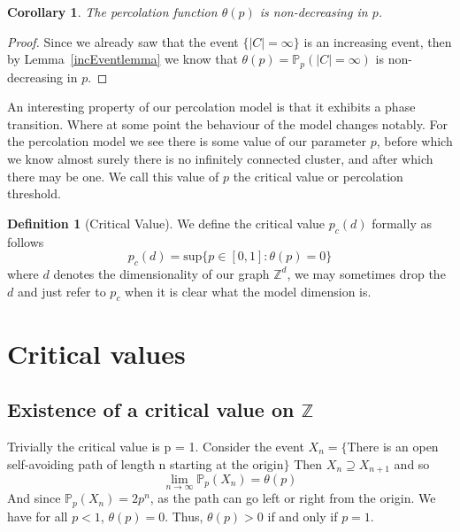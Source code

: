 \documentclass[a4paper,11pt]{article}
\newtheorem{corollary}[theorem]{Corollary}
\theoremstyle{definition}
\newtheorem{definition}[theorem]{Definition}
\newcommand{\ints}{\mathbb{Z}}
\newcommand{\prob}{\mathbb{P}_p}
\begin{document}
\begin{corollary}
	The percolation function $\theta(p)$ is non-decreasing in $p$.
\end{corollary}

\begin{proof}
	Since we already saw that the event $\{|C| = \infty\}$ is an increasing event, then by Lemma~\ref{incEventlemma} we know that $\theta(p) = \prob(|C| = \infty)$ is non-decreasing in $p$.
\end{proof}

An interesting property of our percolation model is that it exhibits a phase transition. Where at some point the behaviour of the model changes notably.
For the percolation model we see there is some value of our parameter $p$, before which we know almost surely there is no infinitely connected cluster, and after which there may be one.
We call this value of $p$ the critical value or percolation threshold.
\begin{definition}[Critical Value]
	We define the critical value $p_c(d)$ formally as follows
	$$p_c(d) = \text{sup}\{p \in [0,1]: \theta(p)=0\} $$
	where $d$ denotes the dimensionality of our graph $\ints^d$, we may sometimes drop the $d$ and just refer to $p_c$ when it is clear what the model dimension is.
\end{definition}



\section{Critical values}
\subsection {Existence of a critical value on \texorpdfstring{$\ints$}{ Z}}\label{critvalforZ}
Trivially the critical value is p = 1. Consider the event $X_n = \{$There is an open self-avoiding path of length n starting at the origin$\}$ 
Then $X_n \supseteq X_{n+1}$ and so 
$$\lim_{n\rightarrow \infty} \prob (X_n) = \theta(p)$$
And since $\prob (X_n) = 2p^n$, as the path can go left or right from the origin. We have for all $p <1$, $\theta(p) = 0$. Thus, $\theta(p) > 0$ if and only if $p = 1$. 
\end{document}
